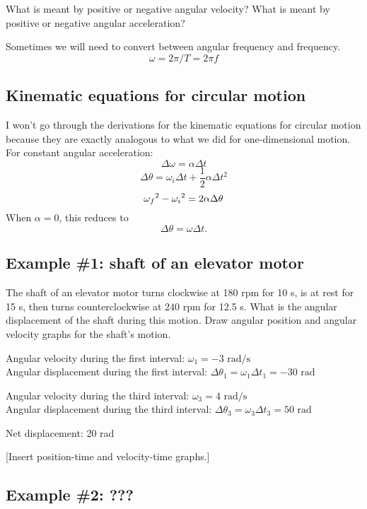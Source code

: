 What is meant by positive or negative angular velocity? What is meant by positive or negative angular acceleration?

Sometimes we will need to convert between angular frequency and frequency.
$$\omega=2\pi/T=2\pi f$$
 
\subsection{Kinematic equations for circular motion}
I won't go through the derivations for the kinematic equations for circular motion because they are exactly analogous to what we did for one-dimensional motion. For constant angular acceleration:
$$\Delta\omega=\alpha\Delta{t}$$
$$\Delta\theta=\omega_i\Delta{t}+\frac{1}{2}\alpha\Delta{t}^2$$
$$\omega_f\displaystyle^2-\omega_i\displaystyle^2=2\alpha\Delta\theta$$
When $\alpha=0$, this reduces to
$$\Delta\theta=\omega\Delta{t}.$$



\subsection{Example \#1: shaft of an elevator motor}
The shaft of an elevator motor turns clockwise at 180 rpm for 10 s, is at rest for 15 s, then turns counterclockwise at 240 rpm for 12.5 s. What is the angular displacement of the shaft during this motion. Draw angular position and angular velocity graphs for the shaft's motion.

Angular velocity during the first interval: $\omega_1=-3\mbox{ rad/s}$\\
Angular displacement during the first interval: $\Delta\theta_1=\omega_1\Delta{t_1}=-30\mbox{ rad}$

Angular velocity during the third interval: $\omega_3=4\mbox{ rad/s}$\\
Angular displacement during the third interval: $\Delta\theta_3=\omega_3\Delta{t_3}=50\mbox{ rad}$

Net displacement: 20 rad

[Insert position-time and velocity-time graphs.]


\subsection{Example \#2: ???}


\clearpage
